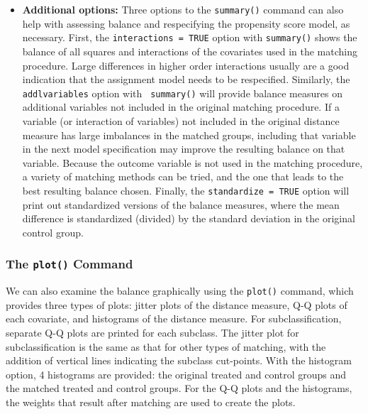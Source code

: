 \begin{itemize}
\item {\bf Additional options:} Three options to the \texttt{summary()}
  command can also help with assessing balance and respecifying the
  propensity score model, as necessary.  First, the {\tt interactions
    = TRUE} option with {\tt summary()} shows the balance of all
  squares and interactions of the covariates used in the matching
  procedure.  Large differences in higher order interactions usually
  are a good indication that the assignment model needs to be
  respecified.  Similarly, the {\tt addlvariables} option with {\tt
    summary()} will provide balance measures on additional variables
  not included in the original matching procedure.  If a variable (or
  interaction of variables) not included in the original distance
  measure has large imbalances in the matched groups, including that
  variable in the next model specification may improve the resulting
  balance on that variable.  Because the outcome variable is not used
  in the matching procedure, a variety of matching methods can be
  tried, and the one that leads to the best resulting balance chosen.  Finally,
  the {\tt standardize = TRUE} option will print out standardized versions of the
  balance measures, where the mean difference is standardized (divided) by the standard deviation
  in the original control group.
\end{itemize}

\subsubsection{The \texttt{plot()} Command}

We can also examine the balance graphically using the \texttt{plot()}
command, which provides three types of plots: jitter plots of the
distance measure, Q-Q plots of each covariate, and histograms of the 
distance measure.  For subclassification, separate Q-Q plots are
printed for each subclass.  The jitter plot for subclassification is
the same as that for other types of matching, with the addition of
vertical lines indicating the subclass cut-points.  With the histogram option,
4 histograms are provided: the original treated and control groups and the matched
treated and control groups.  For the Q-Q plots and the histograms, the weights that result
after matching are used to create the plots.


